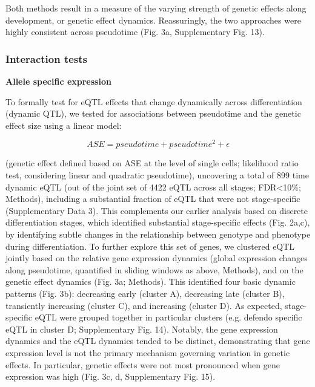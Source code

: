 Both methods result in a measure of the varying strength of genetic effects along development, or genetic effect dynamics. 
Reassuringly, the two approaches were highly consistent across pseudotime (Fig. 3a, Supplementary Fig. 13).\\

\subsubsection{Interaction tests}

\textbf{Allele specific expression}

To formally test for eQTL effects that change dynamically across differentiation (dynamic QTL), we tested for associations between pseudotime and the genetic effect size using a linear model:

\begin{equation}
    ASE = pseudotime + pseudotime^2 + \epsilon
\end{equation}

(genetic effect defined based on ASE at the level of single cells; likelihood ratio test, considering linear and quadratic pseudotime), uncovering a total of 899 time dynamic eQTL (out of the joint set of 4422 eQTL across all stages; FDR<10\%; Methods), including a substantial fraction of eQTL that were not stage-specific (Supplementary Data 3). 
This complements our earlier analysis based on discrete differentiation stages, which identified substantial stage-specific effects (Fig. 2a,c), by identifying subtle changes in the relationship between genotype and phenotype during differentiation. 
To further explore this set of genes, we clustered eQTL jointly based on the relative gene expression dynamics (global expression changes along pseudotime, quantified in sliding windows as above, Methods), and on the genetic effect dynamics (Fig. 3a; Methods). 
This identified four basic dynamic patterns (Fig. 3b): decreasing early (cluster A), decreasing late (cluster B), transiently increasing (cluster C), and increasing (cluster D). As expected, stage-specific eQTL were grouped together in particular clusters (e.g. defendo specific eQTL in cluster D; Supplementary Fig. 14). 
Notably, the gene expression dynamics and the eQTL dynamics tended to be distinct, demonstrating that gene expression level is not the primary mechanism governing variation in genetic effects. 
In particular, genetic effects were not most pronounced when gene expression was high (Fig. 3c, d, Supplementary Fig. 15).\\

